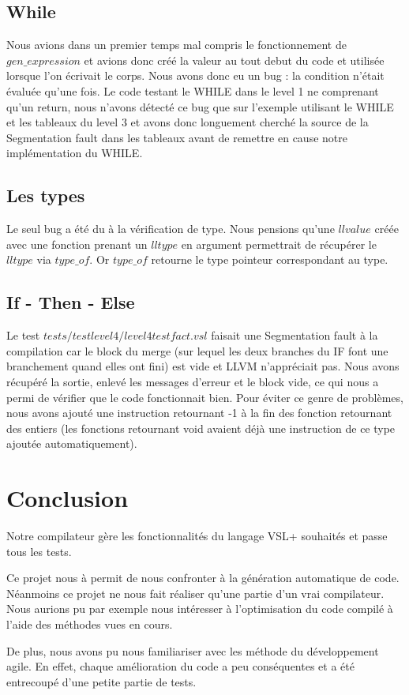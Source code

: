 \documentclass[10pt,a4paper]{article}
\begin{document}
\subsection{While}

Nous avions dans un premier temps mal compris le fonctionnement de $gen\_expression$ et avions donc cr\'e\'e la valeur au tout debut du code et utilis\'ee lorsque l'on \'ecrivait le corps. Nous avons donc eu un bug : la condition n'\'etait \'evalu\'ee qu'une fois. Le code testant le WHILE dans le level 1 ne comprenant qu'un return, nous n'avons d\'etect\'e ce bug que sur l'exemple utilisant le WHILE et les tableaux du level 3 et avons donc longuement cherch\'e la source de la Segmentation fault dans les tableaux avant de remettre en cause notre impl\'ementation du WHILE. 

\subsection{Les types} 

Le seul bug a \'et\'e du \`a la v\'erification de type. Nous pensions qu'une $llvalue$ cr\'e\'ee avec une fonction prenant un $lltype$ en argument permettrait de r\'ecup\'erer le $lltype$ via $type\_of$. Or $type\_of$ retourne le type pointeur correspondant au type.

\subsection{If - Then - Else}

Le test $tests/testlevel4/level4testfact.vsl$ faisait une Segmentation fault \`a la compilation car le block du merge (sur lequel les deux branches du IF font une branchement quand elles ont fini) est vide et LLVM n'appr\'eciait pas. Nous avons r\'ecup\'er\'e la sortie, enlev\'e les messages d'erreur et le block vide, ce qui nous a permi de v\'erifier que le code fonctionnait bien. Pour \'eviter ce genre de probl\`emes, nous avons ajout\'e une instruction retournant -1 \`a la fin des fonction retournant des entiers (les fonctions retournant void avaient d\'ej\`a une instruction de ce type ajout\'ee automatiquement).

\section{Conclusion}

Notre compilateur gère les fonctionnalités du langage VSL+ souhaités et passe tous les tests.

Ce projet nous à permit de nous confronter à la génération automatique de code. 
Néanmoins ce projet ne nous fait réaliser qu'une partie d'un vrai compilateur. Nous aurions pu par exemple nous intéresser à l'optimisation du code compilé à l'aide des méthodes vues en cours.

De plus, nous avons pu nous familiariser avec les méthode du développement agile. En effet, chaque amélioration du code a peu conséquentes et a été entrecoupé d'une petite partie de tests.
\end{document}
